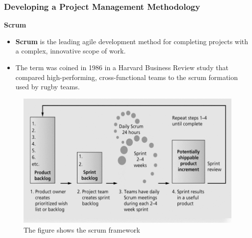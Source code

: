\documentclass[aspectratio=169]{beamer}
\begin{document}
\begin{frame}
\frametitle{Developing a Project Management Methodology}
\textbf{Scrum}
\vspace{0.25cm}
\begin{itemize}
\item \textbf{Scrum} is the leading agile development method for completing projects with a complex, innovative scope of work.
\item The term was coined in 1986 in a Harvard Business Review study that compared high-performing, cross-functional teams to the scrum formation used by rugby teams.
\end{itemize}
\begin{figure}
\includegraphics[scale=0.27]{scrum}
\caption{The figure shows the scrum framework}
\end{figure}
\end{frame}
\end{document}
